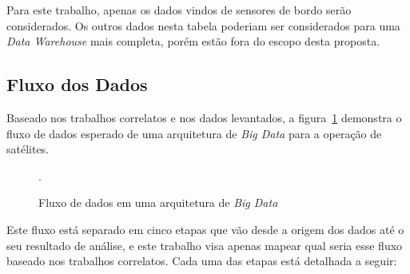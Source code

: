 Para este trabalho, apenas os dados vindos de sensores de bordo serão considerados.
Os outros dados nesta tabela poderiam ser considerados para uma \textit{Data Warehouse} mais completa, porém estão fora do escopo desta proposta.

\subsection{Fluxo dos Dados}\label{ch:corr:dataflow}

Baseado nos trabalhos correlatos e nos dados levantados, a figura~\ref{fig:bigdataflow} demonstra o fluxo de dados esperado de uma arquitetura de \textit{Big Data} para a operação de satélites.

\begin{figure}[ht]
	\caption{Fluxo de dados em uma arquitetura de \textit{Big Data}}\label{fig:bigdataflow}
	\vspace{6mm}
	\begin{center}
	\end{center}
	\vspace{2mm}
	\legenda{}
	.
\end{figure}

Este fluxo está separado em cinco etapas que vão desde a origem dos dados até o seu resultado de análise, e este trabalho visa apenas mapear qual seria esse fluxo baseado nos trabalhos correlatos.
Cada uma das etapas está detalhada a seguir:

